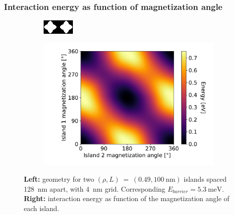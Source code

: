 \documentclass[11pt,a4paper,english]{article}
\begin{document}
\subsubsection{Interaction energy as function of magnetization angle}
\label{par:TwoIslands_InteractionAngle}
\begin{figure}
    \centering
    \begin{subfigure}[c]{4cm} %
         \centering
         \includegraphics[width=\textwidth]{Figures/two_islands/Geometry/geom_r0.49_s100_d128_a0,0_cell4nm.png}
     \end{subfigure}
    \begin{subfigure}[c]{0.7\columnwidth}
         \centering
         \includegraphics[width=\textwidth]{Figures/two_islands/EnergyLandscape/Int_a0Pi,0Pi_d128_r0.49,0.49_cell4nm.pdf}
     \end{subfigure}
    \caption{\textbf{Left:} geometry for two $(\rho, L)~=~(0.49, \SI{100}{\nano\metre})$ islands spaced \SI{128}{\nano\metre} apart, with \SI{4}{\nano\metre} grid. Corresponding $E_{barrier}=\SI{5.3}{\milli\electronvolt}$. \textbf{Right:} interaction energy as function of the magnetization angle of each island.}
    \label{fig:two-islands_interaction_(r0.49_L100)_a0and0}
\end{figure}
\end{document}

